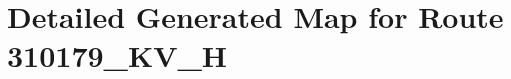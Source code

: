 \section{Detailed Generated Map for Route 310179\_KV\_H} %
\label{sec:detailed_generated_map_for_route_310179_kv_h}





